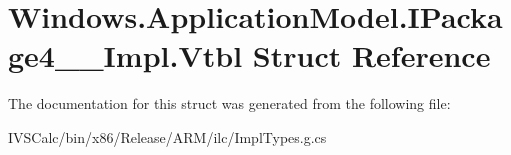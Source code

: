 \hypertarget{struct_windows_1_1_application_model_1_1_i_package4_____impl_1_1_vtbl}{}\section{Windows.\+Application\+Model.\+I\+Package4\+\_\+\+\_\+\+Impl.\+Vtbl Struct Reference}
\label{struct_windows_1_1_application_model_1_1_i_package4_____impl_1_1_vtbl}


The documentation for this struct was generated from the following file\+:\begin{DoxyCompactItemize}
\item 
I\+V\+S\+Calc/bin/x86/\+Release/\+A\+R\+M/ilc/Impl\+Types.\+g.\+cs\end{DoxyCompactItemize}
